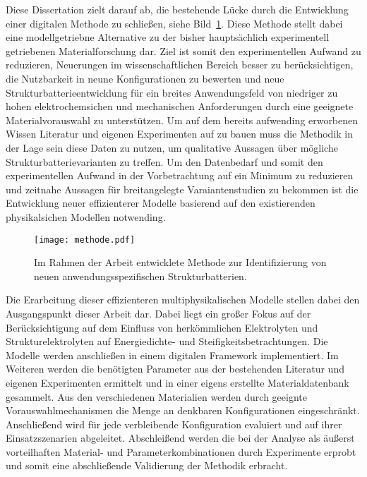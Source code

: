 Diese Dissertation zielt darauf ab, die bestehende Lücke durch die Entwicklung einer digitalen Methode zu schließen, siehe Bild~\ref{fig:own_methode}. Diese Methode stellt dabei eine modellgetriebne Alternative zu der bisher hauptsächlich experimentell getriebenen Materialforschung dar. Ziel ist somit den experimentellen Aufwand zu reduzieren, Neuerungen im wissenschaftlichen Bereich besser zu berücksichtigen, die Nutzbarkeit in neune Konfigurationen zu bewerten und neue Strukturbatterieentwicklung für ein breites Anwendungsfeld von niedriger zu hohen elektrochemsichen und mechanischen Anforderungen durch eine geeignete Materialvorauswahl zu unterstützen. Um auf dem bereits aufwending erworbenen Wissen Literatur und eigenen Experimenten auf zu bauen muss die Methodik in der Lage sein diese Daten zu nutzen, um qualitative Aussagen über mögliche Strukturbatterievarianten zu treffen. Um den Datenbedarf und somit den experimentellen Aufwand in der Vorbetrachtung auf ein Minimum zu reduzieren und zeitnahe Aussagen für breitangelegte Varaiantenstudien zu bekommen ist die Entwicklung neuer effizienterer Modelle basierend auf den existierenden physikalsichen Modellen notwending.

\begin{figure}[ht]
        \center
	\texttt{[image: methode.pdf]}
		\caption{\label{fig:own_methode}Im Rahmen der Arbeit entwicklete Methode zur Identifizierung von neuen anwendungsspezifischen Strukturbatterien.}
\end{figure}

Die Erarbeitung dieser effizienteren multiphysikalischen Modelle stellen dabei den Ausgangspunkt dieser Arbeit dar. Dabei liegt ein großer Fokus auf der Berücksichtigung auf dem Einfluss von herkömmlichen Elektrolyten und Strukturelektrolyten auf Energiedichte- und Steifigkeitsbetrachtungen. Die Modelle werden anschließen in einem digitalen Framework implementiert. Im Weiteren werden die benötigten Parameter aus der bestehenden Literatur und eigenen Experimenten ermittelt und in einer eigens erstellte Materialdatenbank gesammelt. Aus den verschiedenen Materialien werden durch geeignte Vorauswahlmechanismen die Menge an denkbaren Konfigurationen eingeschränkt. Anschließend wird für jede verbleibende Konfiguration evaluiert und auf ihrer Einsatzszenarien abgeleitet. %
Abschleißend werden die bei der Analyse als äußerst vorteilhaften Material- und Parameterkombinationen durch Experimente erprobt und somit eine abschließende Validierung der Methodik erbracht. %

